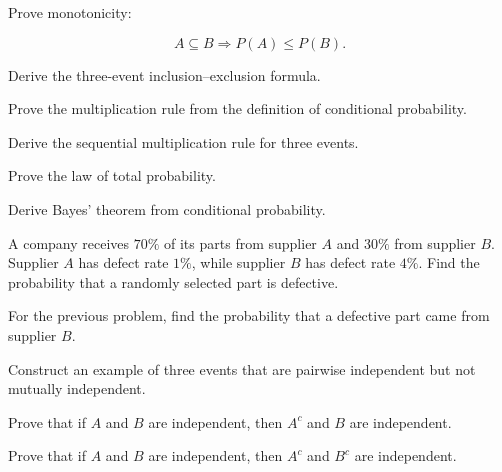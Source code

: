 \begin{exercise}[3]
Prove monotonicity:

\[
A\subseteq B
\Longrightarrow
P(A)\leq P(B).
\]
\end{exercise}

\begin{exercise}[3]
Derive the three-event inclusion--exclusion formula.
\end{exercise}

\begin{exercise}[3]
Prove the multiplication rule from the definition of conditional
probability.
\end{exercise}

\begin{exercise}[3]
Derive the sequential multiplication rule for three events.
\end{exercise}

\begin{exercise}[3]
Prove the law of total probability.
\end{exercise}

\begin{exercise}[3]
Derive Bayes' theorem from conditional probability.
\end{exercise}

\begin{exercise}[3]
A company receives \(70\%\) of its parts from supplier \(A\) and
\(30\%\) from supplier \(B\). Supplier \(A\) has defect rate \(1\%\),
while supplier \(B\) has defect rate \(4\%\). Find the probability that
a randomly selected part is defective.
\end{exercise}

\begin{exercise}[3]
For the previous problem, find the probability that a defective part
came from supplier \(B\).
\end{exercise}

\begin{exercise}[3]
Construct an example of three events that are pairwise independent but
not mutually independent.
\end{exercise}

\begin{exercise}[3]
Prove that if \(A\) and \(B\) are independent, then \(A^c\) and \(B\)
are independent.
\end{exercise}

\begin{exercise}[3]
Prove that if \(A\) and \(B\) are independent, then \(A^c\) and \(B^c\)
are independent.
\end{exercise}


